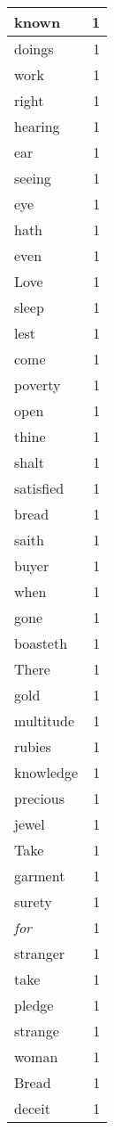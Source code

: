 \begin{center}
\begin{longtable}{l|r}
known & 1\\ \hline 
doings & 1\\ \hline 
work & 1\\ \hline 
right & 1\\ \hline 
hearing & 1\\ \hline 
ear & 1\\ \hline 
seeing & 1\\ \hline 
eye & 1\\ \hline 
hath & 1\\ \hline 
even & 1\\ \hline 
Love & 1\\ \hline 
sleep & 1\\ \hline 
lest & 1\\ \hline 
come & 1\\ \hline 
poverty & 1\\ \hline 
open & 1\\ \hline 
thine & 1\\ \hline 
shalt & 1\\ \hline 
satisfied & 1\\ \hline 
bread & 1\\ \hline 
saith & 1\\ \hline 
buyer & 1\\ \hline 
when & 1\\ \hline 
gone & 1\\ \hline 
boasteth & 1\\ \hline 
There & 1\\ \hline 
gold & 1\\ \hline 
multitude & 1\\ \hline 
rubies & 1\\ \hline 
knowledge & 1\\ \hline 
precious & 1\\ \hline 
jewel & 1\\ \hline 
Take & 1\\ \hline 
garment & 1\\ \hline 
surety & 1\\ \hline 
\emph{for} & 1\\ \hline 
stranger & 1\\ \hline 
take & 1\\ \hline 
pledge & 1\\ \hline 
strange & 1\\ \hline 
woman & 1\\ \hline 
Bread & 1\\ \hline 
deceit & 1\\ \hline 

\end{longtable}
\end{center}
